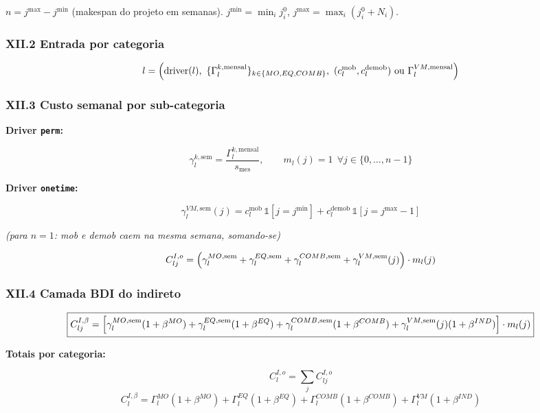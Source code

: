 \documentclass[
  10pt,
]{article}
\begin{document}
\(n = j^{\max}-j^{\min}\) (makespan do projeto em semanas).
\(j^{\min}=\min_i j_i^0\), \(j^{\max}=\max_i(j_i^0+N_i)\).

\hypertarget{xii.2-entrada-por-categoria}{%
\subsubsection{XII.2 Entrada por
categoria}\label{xii.2-entrada-por-categoria}}

\[l = \Bigl(\text{driver}(l),\ \{\Gamma_l^{k,\text{mensal}}\}_{k\in\{MO,EQ,COMB\}},\ (c_l^{\text{mob}},c_l^{\text{demob}})\ \text{ou}\ \Gamma_l^{VM,\text{mensal}}\Bigr)\]

\hypertarget{xii.3-custo-semanal-por-sub-categoria}{%
\subsubsection{XII.3 Custo semanal por
sub-categoria}\label{xii.3-custo-semanal-por-sub-categoria}}

\textbf{Driver \texttt{perm}:}

\[\gamma_l^{k,\text{sem}} = \frac{\Gamma_l^{k,\text{mensal}}}{s_{\text{mes}}}, \qquad m_l(j)=1 \ \ \forall j\in\{0,\ldots,n-1\}\]

\textbf{Driver \texttt{onetime}:}

\[\gamma_l^{VM,\text{sem}}(j) = c_l^{\text{mob}}\,\mathbb{1}[j=j^{\min}] + c_l^{\text{demob}}\,\mathbb{1}[j=j^{\max}-1]\]

\emph{(para \(n=1\): mob e demob caem na mesma semana, somando-se)}

\[C_{lj}^{I,o} = \Bigl(\gamma_l^{MO,\text{sem}}+\gamma_l^{EQ,\text{sem}}+\gamma_l^{COMB,\text{sem}}+\gamma_l^{VM,\text{sem}}(j)\Bigr)\cdot m_l(j)\]

\hypertarget{xii.4-camada-bdi-do-indireto}{%
\subsubsection{XII.4 Camada BDI do
indireto}\label{xii.4-camada-bdi-do-indireto}}

\[\boxed{C_{lj}^{I,\beta} = \Bigl[\gamma_l^{MO,\text{sem}}(1+\beta^{MO})+\gamma_l^{EQ,\text{sem}}(1+\beta^{EQ})+\gamma_l^{COMB,\text{sem}}(1+\beta^{COMB})+\gamma_l^{VM,\text{sem}}(j)(1+\beta^{IND})\Bigr]\cdot m_l(j)}\]

\textbf{Totais por categoria:}

\[C_l^{I,o} = \sum_j C_{lj}^{I,o}\]
\[C_l^{I,\beta} = \Gamma_l^{MO}(1+\beta^{MO})+\Gamma_l^{EQ}(1+\beta^{EQ})+\Gamma_l^{COMB}(1+\beta^{COMB})+\Gamma_l^{VM}(1+\beta^{IND})\]
\end{document}
